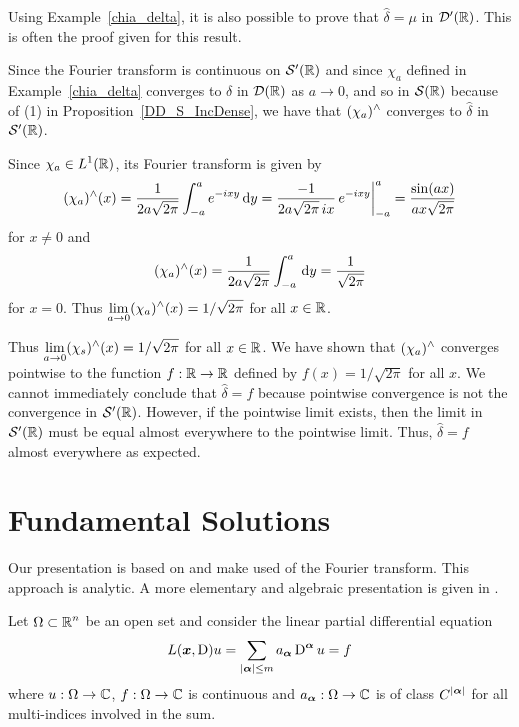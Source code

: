 \begin{egg}
Using Example~\ref{chia_delta}, it is also possible to prove that
$\hat{\delta} = \mu$ in $\mathcal{D}'(\mathbb{R})$.   This is often the proof given
for this result.

Since the Fourier transform is continuous on $\mathcal{S}'(\mathbb{R})$ and since
$\chi_a$ defined in Example~\ref{chia_delta} converges to $\delta$
in $\mathcal{D}(\mathbb{R})$ as $a \to 0$, and so in $\mathcal{S}(\mathbb{R})$ because of (1) in
Proposition~\ref{DD_S_IncDense}, we have that
$\displaystyle (\chi_a)^\wedge$ converges to $\hat{\delta}$ in $\mathcal{S}'(\mathbb{R})$.

Since $\displaystyle \chi_a \in L^1(\mathbb{R})$, its Fourier transform is
given by
\[
(\chi_a)^\wedge(x) = \frac{1}{2a \sqrt{2\pi}}\int_{-a}^a e^{-ix y}\,\mathrm{d}{y}
= \frac{-1}{2a \sqrt{2\pi}\, i x}\, e^{-i x y}\bigg|_{-a}^a
= \frac{\sin(a x)}{a x \sqrt{2\pi}}
\]
for $x \neq 0$ and
\[
(\chi_a)^\wedge(x) = \frac{1}{2a \sqrt{2\pi}}\int_{-a}^a \,\mathrm{d}{y}
= \frac{1}{\sqrt{2\pi}}
\]
for $x = 0$.   Thus
$\displaystyle \lim_{a\to 0} (\chi_a)^\wedge(x) = 1/\sqrt{2\pi}$
for all $x \in \mathbb{R}$.

Thus $\displaystyle \lim_{a\to 0} (\chi_s)^\wedge(x) = 1/\sqrt{2\pi}$
for all $x \in \mathbb{R}$.  We have shown that
$\displaystyle (\chi_a)^\wedge$ converges pointwise to the function
$f:\mathbb{R}\to \mathbb{R}$ defined by $f(x) = 1/\sqrt{2\pi}$ for
all $x$.  We cannot immediately conclude that $\hat{\delta} = f$
because pointwise convergence is not the convergence in $\mathcal{S}'(\mathbb{R})$.
However, if the pointwise limit exists, then the limit in $\mathcal{S}'(\mathbb{R})$
must be equal almost everywhere to the pointwise limit.  Thus,
$\hat{\delta} = f$ almost everywhere as expected.
\end{egg}

\section{Fundamental Solutions}

Our presentation is based on \cite{FoPDE} and make used of the Fourier
transform.  This approach is analytic.  A more elementary and algebraic
presentation is given in \cite{Smo}.

Let $\displaystyle \Omega \subset \mathbb{R}^n$ be an open set and consider
the linear partial differential equation
\begin{equation} \label{distr_lPDE2}
L({\bm{x}},\operatorname{D})u = \sum_{|{\bm{\alpha}}|\leq m} a_{{\bm{\alpha}}}
\operatorname{D}^{{\bm{\alpha}}} u = f
\end{equation}
where $u:\Omega \rightarrow \mathbb{C}$, $f:\Omega \rightarrow \mathbb{C}$ is
continuous and $a_{{\bm{\alpha}}}:\Omega \rightarrow \mathbb{C}$ is of class
$\displaystyle C^{|{\bm{\alpha}}|}$ for all multi-indices involved in the sum.

